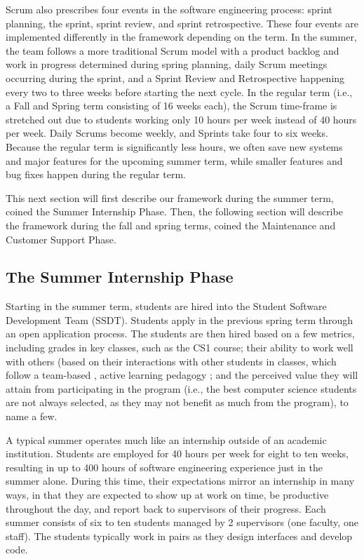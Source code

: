 Scrum also prescribes four events in the software engineering process: sprint planning, the sprint, sprint review, and sprint retrospective. These four events are implemented differently in the framework depending on the term. In the summer, the team follows a more traditional Scrum model with a product backlog and work in progress determined during spring planning, daily Scrum meetings occurring during the sprint, and a Sprint Review and Retrospective happening every two to three weeks before starting the next cycle. In the regular term (i.e., a Fall and Spring term consisting of 16 weeks each), the Scrum time-frame is stretched out due to students working only 10 hours per week instead of 40 hours per week. Daily Scrums become weekly, and Sprints take four to six weeks. Because the regular term is significantly less hours, we often save new systems and major features for the upcoming summer term, while smaller features and bug fixes happen during the regular term.

This next section will first describe our framework during the summer term, coined the Summer Internship Phase. Then, the following section will describe the framework during the fall and spring terms, coined the Maintenance and Customer Support Phase.

\subsection{The Summer Internship Phase}
Starting in the summer term, students are hired into the Student Software Development Team (SSDT). Students apply in the previous spring term through an open application process. The students are then hired based on a few metrics, including grades in key classes, such as the CS1 course; their ability to work well with others (based on their interactions with other students in classes, which follow a team-based \cite{2002PairProgramming}, active learning pedagogy \cite{2012Pogil}; and the perceived value they will attain from participating in the program (i.e., the best computer science students are not always selected, as they may not benefit as much from the program), to name a few.

A typical summer operates much like an internship outside of an academic institution. Students are employed for 40 hours per week for eight to ten weeks, resulting in up to 400 hours of software engineering experience just in the summer alone. During this time, their expectations mirror an internship in many ways, in that they are expected to show up at work on time, be productive throughout the day, and report back to supervisors of their progress. Each summer consists of six to ten students managed by 2 supervisors (one faculty, one staff). The students typically work in pairs as they design interfaces and develop code.

